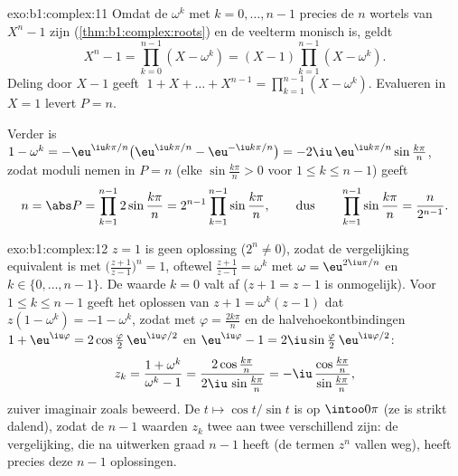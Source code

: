 \begin{solution}{exo:b1:complex:11}
Omdat de $\omega^k$ met $k = 0, \dots, n-1$ precies de $n$ wortels van
$X^n - 1$ zijn (\cref{thm:b1:complex:roots}) en de veelterm monisch is,
geldt
\[
X^n - 1 = \prod_{k=0}^{n-1} (X - \omega^k)
= (X - 1) \prod_{k=1}^{n-1} (X - \omega^k).
\]
Deling door $X - 1$ geeft $\;1 + X + \dots + X^{n-1} =
\prod_{k=1}^{n-1} (X - \omega^k)$. Evalueren in $X = 1$ levert $P = n$.

Verder is $1 - \omega^k = -\eu^{\iu k\pi/n}\bigl(\eu^{\iu k\pi/n} -
\eu^{-\iu k\pi/n}\bigr) = -2\iu\,\eu^{\iu k\pi/n} \sin\frac{k\pi}{n}$,
zodat moduli nemen in $P = n$ (elke $\sin\frac{k\pi}n > 0$ voor $1 \leq
k \leq n-1$) geeft
\[
n = \abs P = \prod_{k=1}^{n-1} 2\sin\frac{k\pi}{n}
= 2^{n-1} \prod_{k=1}^{n-1} \sin\frac{k\pi}{n},
\qquad\text{dus}\qquad
\prod_{k=1}^{n-1} \sin\frac{k\pi}{n} = \frac{n}{2^{n-1}} .
\]
\end{solution}

\begin{solution}{exo:b1:complex:12}
$z = 1$ is geen oplossing ($2^n \neq 0$), zodat de vergelijking
equivalent is met $\bigl(\frac{z+1}{z-1}\bigr)^n = 1$, oftewel
$\frac{z+1}{z-1} = \omega^k$ met $\omega = \eu^{2\iu\pi/n}$ en $k \in
\{0, \dots, n-1\}$. De waarde $k = 0$ valt af ($z + 1 = z - 1$ is
onmogelijk). Voor $1 \leq k \leq n - 1$ geeft het oplossen van $z + 1 =
\omega^k(z - 1)$ dat $z(1 - \omega^k) = -1 - \omega^k$, zodat met
$\varphi = \frac{2k\pi}{n}$ en de halvehoekontbindingen $1 +
\eu^{\iu\varphi} = 2\cos\frac\varphi2\, \eu^{\iu\varphi/2}$ en
$\eu^{\iu\varphi} - 1 = 2\iu\sin\frac\varphi2 \,\eu^{\iu\varphi/2}$:
\[
z_k = \frac{1 + \omega^k}{\omega^k - 1}
= \frac{2\cos\frac{k\pi}{n}}{2\iu\,\sin\frac{k\pi}{n}}
= -\iu\,\frac{\cos\frac{k\pi}{n}}{\sin\frac{k\pi}{n}} ,
\]
zuiver imaginair zoals beweerd. De  $t \mapsto \cos t/\sin t$
is  op $\intoo0\pi$ (ze is strikt dalend), zodat de $n - 1$
waarden $z_k$ twee aan twee verschillend zijn: de vergelijking, die na
uitwerken graad $n - 1$ heeft (de termen $z^n$ vallen weg), heeft precies
deze $n - 1$ oplossingen.
\end{solution}

